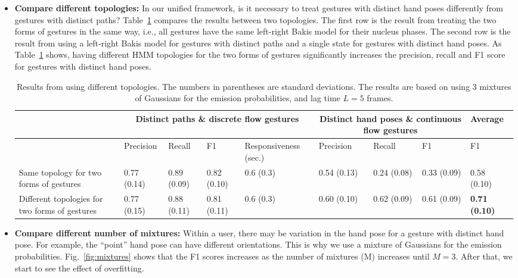 \documentclass[conference]{IEEEtran}
\begin{document}
\begin{itemize}
  \item \textbf{Compare different topologies: }
In our unified framework, is it necessary to
treat gestures with distinct hand poses differently from gestures with
distinct paths? Table~\ref{tab:result} compares the results between two topologies. The first
row is the result from treating the two forms of gestures in the same way,
i.e., all gestures have the same left-right Bakis model for their nucleus
phases. The second row is the result from using a left-right Bakis model for
gestures with distinct paths and a single state for gestures with distinct hand
poses.
As Table~\ref{tab:result} shows, having different HMM topologies for the two forms of gestures significantly increases the precision, recall and F1 score for gestures with
distinct hand poses.

\begin{table}[t]
\caption{Results from using different topologies. The numbers in parentheses are
standard deviations. The results are based on using 3 mixtures of Gaussians
for the emission probabilities, and lag time $L = 5$ frames.}
\label{tab:result}
\centering
\begin{tabular}{|l|l|l|l|l|l|l|l|l|}
\hline
& \multicolumn{4}{|c|}{Distinct paths \& discrete flow gestures} &
\multicolumn{3}{|c|}{Distinct hand poses \& continuous flow gestures} &
Average\\
\hline
& Precision & Recall & F1 & Responsiveness (sec.) & Precision & Recall & F1 &
F1\\
\hline
Same topology for two forms of gestures & 0.77 (0.14) & 0.89 (0.09) & 0.82
(0.10) & 0.6 (0.3) & 0.54 (0.13) & 0.24 (0.08) & 0.33 (0.09) & 0.58 (0.10)
\\
\hline
Different topologies for two forms of gestures & 0.77 (0.15) & 0.88 (0.11) &
0.81 (0.11) & 0.6 (0.3) & 0.60 (0.10) & 0.62 (0.09) & 0.61 (0.09) & \textbf{0.71
(0.10)}\\
\hline
\end{tabular}
\end{table}

\item \textbf{Compare different number of mixtures:}
Within a user, there may be variation in the hand pose for a
gesture with distinct hand pose. For example, the ``point'' hand pose can have
different orientations. This is why we use a mixture of Gaussians for the
emission probabilities. Fig.~\ref{fig:mixtures}
shows that the F1 scores increases as the number of mixtures (M) increases until $M=3$.
After that, we start to see the effect of overfitting.


\end{itemize}
\end{document}
